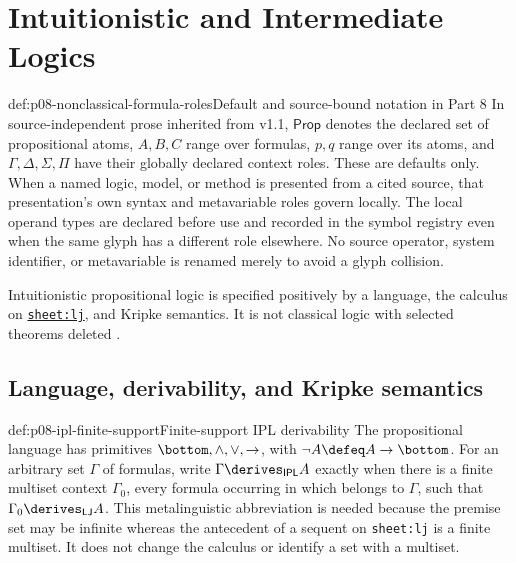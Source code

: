 \chapter{Intuitionistic and Intermediate Logics}
\label{sec:p08-intuitionistic-and-intermediate}

\begin{hbconvention}{def:p08-nonclassical-formula-roles}{Default and source-bound notation in Part 8}
In source-independent prose inherited from v1.1, \(\mathsf{Prop}\) denotes the
declared set of propositional atoms, \(A,B,C\) range over formulas, \(p,q\)
range over its atoms, and \(\Gamma,\Delta,\Sigma,\Pi\) have their globally
declared context roles.  These are defaults only.  When a named logic, model,
or method is presented from a cited source, that presentation's own syntax and
metavariable roles govern locally.  The local operand types are declared before
use and recorded in the symbol registry even when the same glyph has a
different role elsewhere.  No source operator, system identifier, or
metavariable is renamed merely to avoid a glyph collision.
\end{hbconvention}

Intuitionistic propositional logic is specified positively by a language, the
calculus on \hyperref[sheet:lj]{\texttt{sheet:lj}}, and Kripke semantics.  It
is not classical logic with selected theorems deleted
\cite{Kripke1965,TroelstraSchwichtenberg2000}.

\section{Language, derivability, and Kripke semantics}

\begin{hbdefinition}{def:p08-ipl-finite-support}{Finite-support IPL derivability}
The propositional language has primitives
\(\bottom,\land,\lor,\to\), with
\(\neg A\defeq A\to\bottom\).  For an arbitrary set \(\Gamma\) of
formulas, write
\(\Gamma\derives_{\mathsf{IPL}}A\) exactly when there is a finite multiset
context \(\Gamma_0\), every formula occurring in which belongs to \(\Gamma\),
such that \(\Gamma_0\derives_{\mathsf{LJ}}A\).  This metalinguistic
abbreviation is needed because the premise set may be infinite whereas the
antecedent of a sequent on \texttt{sheet:lj} is a finite multiset.  It does
not change the calculus or identify a set with a multiset.
\end{hbdefinition}

